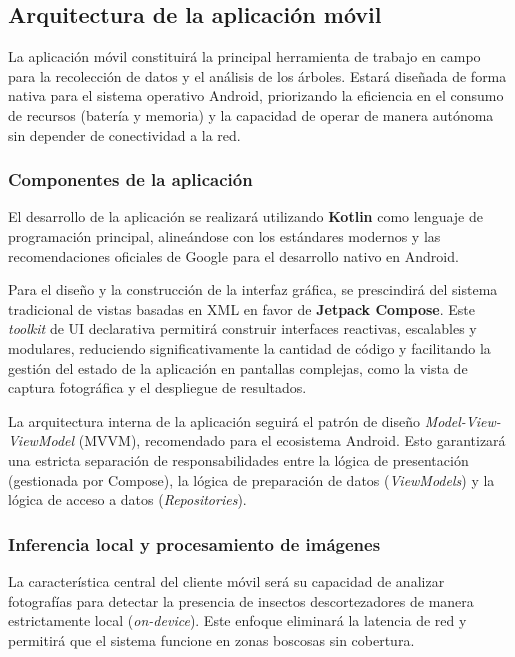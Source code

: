 \newpage
\subsection{Arquitectura de la aplicación móvil}

La aplicación móvil constituirá la principal herramienta de trabajo en campo para la recolección de datos y el análisis de los árboles. Estará diseñada de forma nativa para el sistema operativo Android, priorizando la eficiencia en el consumo de recursos (batería y memoria) y la capacidad de operar de manera autónoma sin depender de conectividad a la red.

\subsubsection{Componentes de la aplicación}

El desarrollo de la aplicación se realizará utilizando \textbf{Kotlin} como lenguaje de programación principal, alineándose con los estándares modernos y las recomendaciones oficiales de Google para el desarrollo nativo en Android. 

Para el diseño y la construcción de la interfaz gráfica, se prescindirá del sistema tradicional de vistas basadas en XML en favor de \textbf{Jetpack Compose}. Este \textit{toolkit} de UI declarativa permitirá construir interfaces reactivas, escalables y modulares, reduciendo significativamente la cantidad de código y facilitando la gestión del estado de la aplicación en pantallas complejas, como la vista de captura fotográfica y el despliegue de resultados.

La arquitectura interna de la aplicación seguirá el patrón de diseño \textit{Model-View-ViewModel} (MVVM), recomendado para el ecosistema Android. Esto garantizará una estricta separación de responsabilidades entre la lógica de presentación (gestionada por Compose), la lógica de preparación de datos (\textit{ViewModels}) y la lógica de acceso a datos (\textit{Repositories}).

\subsubsection{Inferencia local y procesamiento de imágenes}

La característica central del cliente móvil será su capacidad de analizar fotografías para detectar la presencia de insectos descortezadores de manera estrictamente local (\textit{on-device}). Este enfoque eliminará la latencia de red y permitirá que el sistema funcione en zonas boscosas sin cobertura.


